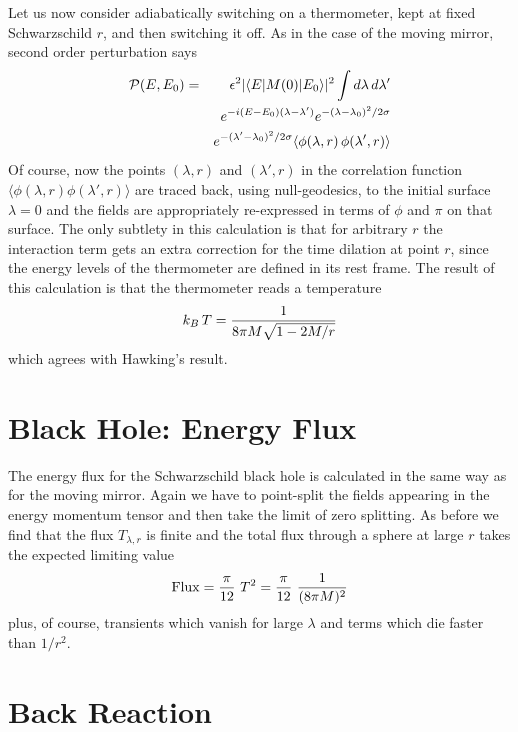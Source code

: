 \documentclass[12pt]{article}
\newcommand{\bra}[1]{\langle  {#1}  \vert }
\newcommand{\ket}[1]{\vert {#1} \rangle }
\begin{document}
Let us now consider adiabatically switching on a thermometer,
kept at fixed Schwarzschild $r$, and then switching it off.  As in the case of the
moving mirror, second order perturbation says
\begin{eqnarray}
{\cal P}(E,E_0) &=& \epsilon^2 \vert \bra{E} M(0) \ket{E_0} \vert^2 \int d\lambda\,d\lambda'\nonumber\\
&&e^{-i(E-E_0)(\lambda-\lambda')} e^{-(\lambda-\lambda_0)^2/2\sigma} \nonumber\\
&&e^{-(\lambda'-\lambda_0)^2/2\sigma} \langle  \phi(\lambda,r) \, \phi(\lambda',r) \rangle
\end{eqnarray}
Of course, now the points $(\lambda,r)$ and $(\lambda',r)$ in the correlation function
$\langle \phi(\lambda,r) \phi(\lambda',r) \rangle$ are traced back, using null-geodesics, to
the initial surface $\lambda=0$ and the fields are appropriately re-expressed
in terms of $\phi$ and $\pi$ on that surface.  The only subtlety in this calculation
is that for arbitrary $r$ the interaction term gets an extra correction for
the time dilation at point $r$, since the energy levels of the thermometer are defined
in its rest frame.  The result of this calculation is that the thermometer reads
a temperature
\begin{equation}
k_B\, T = {1 \over 8 \pi M \sqrt{1 - 2M/r}}
\end{equation}  
which agrees with Hawking's result.

\section{Black Hole: Energy Flux}

The energy flux for the Schwarzschild black hole is calculated in the same way
as for the moving mirror.  Again we have to point-split
the fields appearing in the energy momentum tensor and then take the limit
of zero splitting. As before we find that the flux $T_{\lambda,r}$ is finite
and the total flux through a sphere at large $r$ takes the expected limiting value  
\begin{equation}
  {\rm Flux} = {\pi \over 12}\ T^2  = {\pi\over 12}\ {1 \over (8 \pi M)^2}
\end{equation}
plus, of course, transients which vanish for large $\lambda$ and terms
which die faster than $1/r^2$.

\section{Back Reaction}
\end{document}
